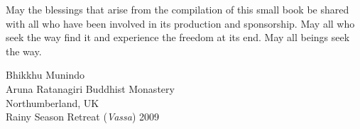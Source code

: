May the blessings that arise from the compilation of this small book be shared
with all who have been involved in its production and sponsorship. May all who
seek the way find it and experience the freedom at its end. May all beings seek
the way.

\bigskip

{\par\raggedleft
Bhikkhu Munindo\\
Aruna Ratanagiri Buddhist Monastery\\
Northumberland, UK\\
Rainy Season Retreat (\emph{Vassa}) 2009
\par}

